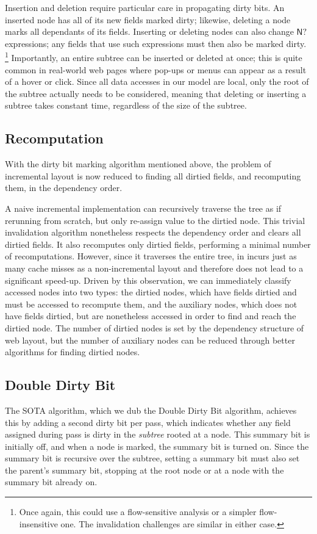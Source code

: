 Insertion and deletion require particular care
  in propagating dirty bits.
An inserted node has all of its new fields marked dirty;
  likewise, deleting a node marks all dependants of its fields.
Inserting or deleting nodes can also change
  $\mathsf{N?}$ expressions;
  any fields that use such expressions must then
  also be marked dirty.%
\footnote{Once again,
  this could use a flow-sensitive analysis or a simpler
  flow-insensitive one.
The invalidation challenges are similar in either case.}
Importantly, an entire subtree can be inserted or deleted at once;
  this is quite common in real-world web pages
  where pop-ups or menus can appear as a result of a hover or click.
Since all data accesses in our model are local,
  only the root of the subtree actually needs to be considered,
  meaning that deleting or inserting a subtree takes constant time,
  regardless of the size of the subtree.

\subsection{Recomputation}
With the dirty bit marking algorithm mentioned above, 
  the problem of incremental layout is now reduced to 
  finding all dirtied fields, and recomputing them, 
  in the dependency order.

A naive incremental implementation can recursively traverse 
  the tree as if rerunning from scratch, 
  but only re-assign value to the dirtied node. 
This trivial invalidation algorithm nonetheless
  respects the dependency order and clears all dirtied fields.
It also recomputes only dirtied fields,
  performing a minimal number of recomputations.
However, since it traverses the entire tree,
  in incurs just as many cache misses as a non-incremental layout
  and therefore does not lead to a significant speed-up.
Driven by this observation, we can immediately classify
  accessed nodes into two types: the dirtied nodes,
  which have fields dirtied and must be accessed to
  recompute them, and the auxiliary nodes, 
  which does not have fields dirtied, but are nonetheless 
  accessed in order to find and reach the dirtied node.
The number of dirtied nodes is set by
  the dependency structure of web layout,
  but the number of auxiliary nodes can be reduced
  through better algorithms for finding dirtied nodes.

\subsection{Double Dirty Bit}
The SOTA algorithm,
  which we dub the Double Dirty Bit algorithm,
  achieves this by adding a second dirty bit
  per pass, which indicates whether
  any field assigned during pass
  is dirty in the \emph{subtree} rooted at a node.
This summary bit is initially off, and when a node is marked,
  the summary bit is turned on.
Since the summary bit is recursive over the subtree,
  setting a summary bit must also set the parent's summary bit,
  stopping at the root node
  or at a node with the summary bit already on.

